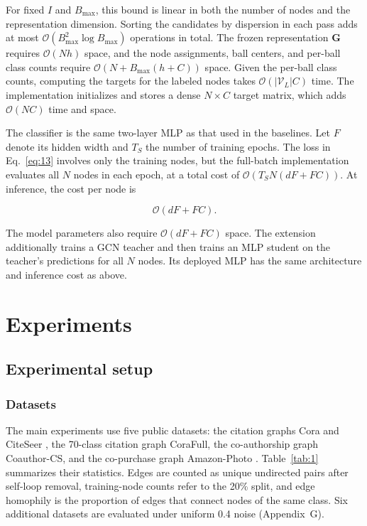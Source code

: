 \documentclass[10pt,letterpaper,nopreprintline]{elsarticle}
\theoremstyle{definition}
\theoremstyle{plain}
\begin{document}
For fixed \(I\) and \(B_{\max}\), this bound is linear in both the number of nodes and the representation dimension. Sorting the candidates by dispersion in each pass adds at most \(\mathcal{O}(B_{\max}^{2}\log B_{\max})\) operations in total. The frozen representation \(\mathbf G\) requires \(\mathcal{O}(Nh)\) space, and the node assignments, ball centers, and per-ball class counts require \(\mathcal{O}(N + B_{\max}(h + C))\) space. Given the per-ball class counts, computing the targets for the labeled nodes takes \(\mathcal{O}(|\mathcal{V}_{L}|C)\) time. The implementation initializes and stores a dense \(N \times C\) target matrix, which adds \(\mathcal{O}(NC)\) time and space.

\Needspace{64pt}

The classifier is the same two-layer MLP as that used in the baselines. Let \(F\) denote its hidden width and \(T_{S}\) the number of training epochs. The loss in Eq.~\eqref{eq:13} involves only the training nodes, but the full-batch implementation evaluates all \(N\) nodes in each epoch, at a total cost of \(\mathcal{O}(T_{S}N(dF + FC))\). At inference, the cost per node is

\begin{equation}\label{eq:23}
\mathcal{O}(dF + FC).
\end{equation}

The model parameters also require \(\mathcal{O}(dF + FC)\) space. The extension additionally trains a GCN teacher and then trains an MLP student on the teacher's predictions for all \(N\) nodes. Its deployed MLP has the same architecture and inference cost as above.

\FloatBarrier

\section{Experiments}\label{sec:4}

\subsection{Experimental setup}\label{sec:4.1}

\subsubsection{Datasets}\label{sec:4.1.1}

The main experiments use five public datasets: the citation graphs Cora and CiteSeer \cite{ref69}, the 70-class citation graph CoraFull, the co-authorship graph Coauthor-CS, and the co-purchase graph Amazon-Photo \cite{ref70}. Table~\ref{tab:1} summarizes their statistics. Edges are counted as unique undirected pairs after self-loop removal, training-node counts refer to the 20\% split, and edge homophily is the proportion of edges that connect nodes of the same class. Six additional datasets are evaluated under uniform 0.4 noise (Appendix~G).
\end{document}

